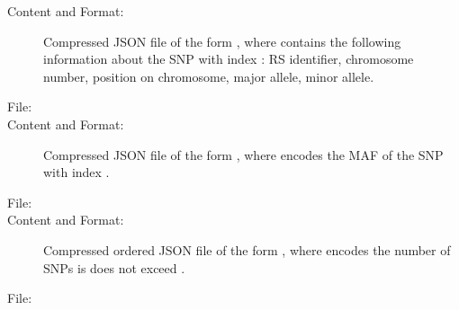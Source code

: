 \documentclass[a4paper,10pt,english]{sphinxhowto}
\begin{document}
\begin{description}
\begin{description}
\begin{description}
\item[{Content and Format:}] \leavevmode
Compressed JSON file of the form , where  contains the following
information about the SNP with index : RS identifier, chromosome number, position on chromosome, major allele, minor allele.

\end{description}

\item[{\sphinxstyleemphasis{MAFs:}}] \leavevmode\begin{description}
\item[{File:}] \leavevmode
{}

\item[{Content and Format:}] \leavevmode
Compressed JSON file of the form , where  encodes the MAF of
the SNP with index .

\end{description}

\item[{\sphinxstyleemphasis{Cumulative MAF distribution:}}] \leavevmode\begin{description}
\item[{File:}] \leavevmode
{}

\item[{Content and Format:}] \leavevmode
Compressed ordered JSON file of the form , where  encodes the
number of SNPs is does not exceed .

\end{description}

\item[{\sphinxstyleemphasis{Plot of Cumulative MAF distribution:}}] \leavevmode\begin{description}
\item[{File:}] \leavevmode
{}


\end{description}
\end{description}
\end{description}
\end{document}
